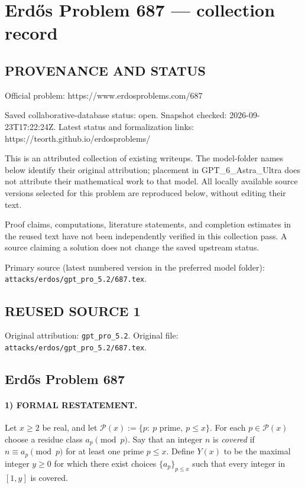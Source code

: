 \section*{Erd\H{o}s Problem 687 --- collection record}

\subsection*{PROVENANCE AND STATUS}
Official problem: https://www.erdosproblems.com/687

Saved collaborative-database status: open.
Snapshot checked: 2026-09-23T17:22:24Z.
Latest status and formalization links: https://teorth.github.io/erdosproblems/

This is an attributed collection of existing writeups. The model-folder names below identify their original attribution; placement in GPT\_6\_Astra\_Ultra does not attribute their mathematical work to that model. All locally available source versions selected for this problem are reproduced below, without editing their text.

Proof claims, computations, literature statements, and completion estimates in the reused text have not been independently verified in this collection pass. A source claiming a solution does not change the saved upstream status.

Primary source (latest numbered version in the preferred model folder): \texttt{attacks/erdos/gpt\_pro\_5.2/687.tex}.

\subsection*{REUSED SOURCE 1}
Original attribution: \texttt{gpt\_pro\_5.2}.
Original file: \texttt{attacks/erdos/gpt\_pro\_5.2/687.tex}.


\subsection*{Erd\H{o}s Problem 687}

\paragraph{1) FORMAL RESTATEMENT.}
Let $x\ge 2$ be real, and let $\mathcal P(x):=\{p:\ p\text{ prime},\ p\le x\}$.
For each $p\in\mathcal P(x)$ choose a residue class $a_p\pmod p$.
Say that an integer $n$ is \emph{covered} if $n\equiv a_p\pmod p$ for at least one prime $p\le x$.
Define $Y(x)$ to be the maximal integer $y\ge 0$ for which there exist choices $\{a_p\}_{p\le x}$ such that every integer in $[1,y]$
is covered.

